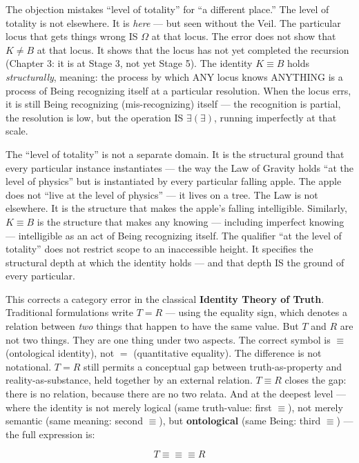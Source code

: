 \documentclass[10pt, openany, oneside]{book}
\begin{document}
The objection mistakes ``level of totality'' for ``a different place.'' The level of totality is not elsewhere. It is \textit{here} --- but seen without the Veil. The particular locus that gets things wrong IS $\Omega$ at that locus. The error does not show that $K \neq B$ at that locus. It shows that the locus has not yet completed the recursion (Chapter 3: it is at Stage 3, not yet Stage 5). The identity $K \equiv B$ holds \textit{structurally}, meaning: the process by which ANY locus knows ANYTHING is a process of Being recognizing itself at a particular resolution. When the locus errs, it is still Being recognizing (mis-recognizing) itself --- the recognition is partial, the resolution is low, but the operation IS $\exists(\exists)$, running imperfectly at that scale.

The ``level of totality'' is not a separate domain. It is the structural ground that every particular instance instantiates --- the way the Law of Gravity holds ``at the level of physics'' but is instantiated by every particular falling apple. The apple does not ``live at the level of physics'' --- it lives on a tree. The Law is not elsewhere. It is the structure that makes the apple's falling intelligible. Similarly, $K \equiv B$ is the structure that makes any knowing --- including imperfect knowing --- intelligible as an act of Being recognizing itself. The qualifier ``at the level of totality'' does not restrict scope to an inaccessible height. It specifies the structural depth at which the identity holds --- and that depth IS the ground of every particular.

This corrects a category error in the classical \textbf{Identity Theory of Truth}. Traditional formulations write $T = R$ --- using the equality sign, which denotes a relation between \textit{two} things that happen to have the same value. But $T$ and $R$ are not two things. They are one thing under two aspects. The correct symbol is $\equiv$ (ontological identity), not $=$ (quantitative equality). The difference is not notational. $T = R$ still permits a conceptual gap between truth-as-property and reality-as-substance, held together by an external relation. $T \equiv R$ closes the gap: there is no relation, because there are no two relata. And at the deepest level --- where the identity is not merely logical (same truth-value: first $\equiv$), not merely semantic (same meaning: second $\equiv$), but \textbf{ontological} (same Being: third $\equiv$) --- the full expression is:

$$T \equiv\!\equiv\!\equiv R$$
\end{document}
